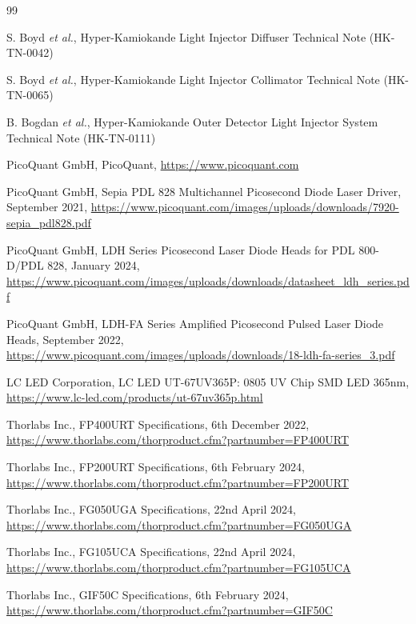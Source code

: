 \documentclass[a4paper,11pt]{article}
\begin{document}
\newpage
\begin{thebibliography}{99}

S. Boyd {\it et al.}, Hyper-Kamiokande Light Injector Diffuser Technical Note (HK-TN-0042)

S. Boyd {\it et al.}, Hyper-Kamiokande Light Injector Collimator Technical Note (HK-TN-0065)

B. Bogdan {\it et al.}, Hyper-Kamiokande Outer Detector Light Injector System Technical Note (HK-TN-0111)

PicoQuant GmbH, PicoQuant, \url{https://www.picoquant.com}

PicoQuant GmbH, Sepia PDL 828 Multichannel Picosecond Diode Laser Driver, September 2021, \url{https://www.picoquant.com/images/uploads/downloads/7920-sepia_pdl828.pdf}

PicoQuant GmbH, LDH Series Picosecond Laser Diode Heads for PDL 800-D/PDL 828, January 2024, \url{https://www.picoquant.com/images/uploads/downloads/datasheet_ldh_series.pdf}

PicoQuant GmbH, LDH-FA Series Amplified Picosecond Pulsed Laser Diode Heads, September 2022, \url{https://www.picoquant.com/images/uploads/downloads/18-ldh-fa-series_3.pdf}

LC LED Corporation, LC LED UT-67UV365P: 0805 UV Chip SMD LED 365nm, \url{https://www.lc-led.com/products/ut-67uv365p.html}

Thorlabs Inc., FP400URT Specifications, 6th December 2022, \url{https://www.thorlabs.com/thorproduct.cfm?partnumber=FP400URT}


Thorlabs Inc., FP200URT Specifications, 6th February 2024, \url{https://www.thorlabs.com/thorproduct.cfm?partnumber=FP200URT}

Thorlabs Inc., FG050UGA Specifications, 22nd April 2024, \url{https://www.thorlabs.com/thorproduct.cfm?partnumber=FG050UGA}

Thorlabs Inc., FG105UCA Specifications, 22nd April 2024, \url{https://www.thorlabs.com/thorproduct.cfm?partnumber=FG105UCA}

Thorlabs Inc., GIF50C Specifications, 6th February 2024, \url{https://www.thorlabs.com/thorproduct.cfm?partnumber=GIF50C}


\end{thebibliography}
\end{document}
